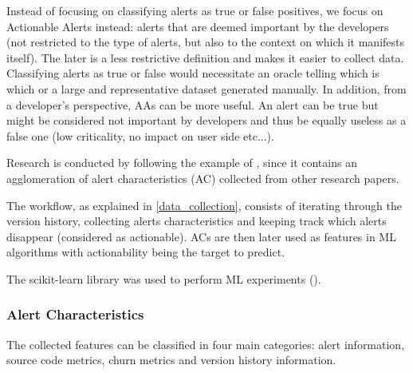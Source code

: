 Instead of focusing on classifying alerts as true or false positives, we focus on Actionable Alerts instead: alerts that are deemed important by the developers (not restricted to the type of alerts, but also to the context on which it manifests itself). The later is a less restrictive definition and makes it easier to collect data. Classifying alerts as true or false would necessitate an oracle telling which is which or a large and representative dataset generated manually. In addition, from a developer's perspective, AAs can be more useful. An alert can be true but might be considered not important by developers and thus be equally useless as a false one (low criticality, no impact on user side etc...).

Research is conducted by following the example of \cite{model_building_actionable}, since it contains an agglomeration of alert characteristics (AC) collected from other research papers.

The workflow, as explained in \cref{data_collection}, consists of iterating through the version history, collecting alerts characteristics and keeping track which alerts disappear (considered as actionable). ACs are then later used as features in ML algorithms with actionability being the target to predict.

The scikit-learn library was used to perform ML experiments (\cite{scikit-learn}).

\subsubsection{Alert Characteristics}

The collected features can be classified in four main categories: alert information, source code metrics, churn metrics and version history information.

